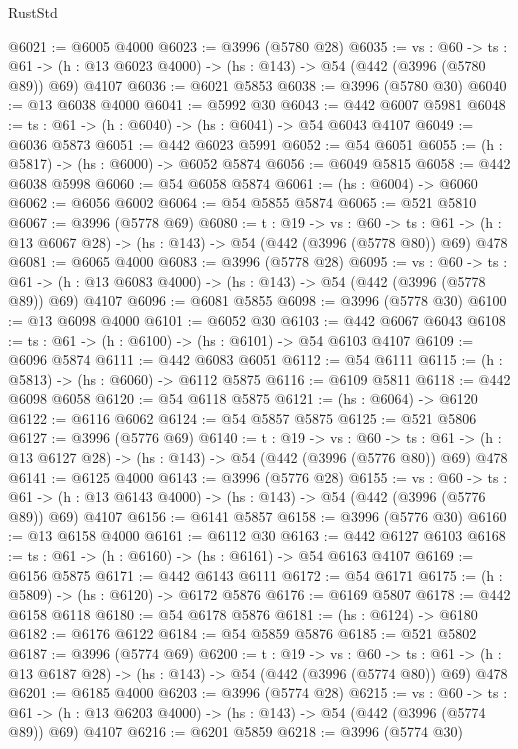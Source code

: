 \begin{lexlean}{RustStd}
\begin{coremodule}
@6021 := @6005 @4000
@6023 := @3996 (@5780 @28)
@6035 := {vs : @60} ->
  {ts : @61} -> (h : @13 @6023 @4000) -> (hs : @143) -> @54 (@442 (@3996 (@5780 @89)) @69) @4107
@6036 := @6021 @5853
@6038 := @3996 (@5780 @30)
@6040 := @13 @6038 @4000
@6041 := @5992 @30
@6043 := @442 @6007 @5981
@6048 := {ts : @61} -> (h : @6040) -> (hs : @6041) -> @54 @6043 @4107
@6049 := @6036 @5873
@6051 := @442 @6023 @5991
@6052 := @54 @6051
@6055 := (h : @5817) -> (hs : @6000) -> @6052 @5874
@6056 := @6049 @5815
@6058 := @442 @6038 @5998
@6060 := @54 @6058 @5874
@6061 := (hs : @6004) -> @6060
@6062 := @6056 @6002
@6064 := @54 @5855 @5874
@6065 := @521 @5810
@6067 := @3996 (@5778 @69)
@6080 := {t : @19} ->
  {vs : @60} ->
  {ts : @61} -> (h : @13 @6067 @28) -> (hs : @143) -> @54 (@442 (@3996 (@5778 @80)) @69) @478
@6081 := @6065 @4000
@6083 := @3996 (@5778 @28)
@6095 := {vs : @60} ->
  {ts : @61} -> (h : @13 @6083 @4000) -> (hs : @143) -> @54 (@442 (@3996 (@5778 @89)) @69) @4107
@6096 := @6081 @5855
@6098 := @3996 (@5778 @30)
@6100 := @13 @6098 @4000
@6101 := @6052 @30
@6103 := @442 @6067 @6043
@6108 := {ts : @61} -> (h : @6100) -> (hs : @6101) -> @54 @6103 @4107
@6109 := @6096 @5874
@6111 := @442 @6083 @6051
@6112 := @54 @6111
@6115 := (h : @5813) -> (hs : @6060) -> @6112 @5875
@6116 := @6109 @5811
@6118 := @442 @6098 @6058
@6120 := @54 @6118 @5875
@6121 := (hs : @6064) -> @6120
@6122 := @6116 @6062
@6124 := @54 @5857 @5875
@6125 := @521 @5806
@6127 := @3996 (@5776 @69)
@6140 := {t : @19} ->
  {vs : @60} ->
  {ts : @61} -> (h : @13 @6127 @28) -> (hs : @143) -> @54 (@442 (@3996 (@5776 @80)) @69) @478
@6141 := @6125 @4000
@6143 := @3996 (@5776 @28)
@6155 := {vs : @60} ->
  {ts : @61} -> (h : @13 @6143 @4000) -> (hs : @143) -> @54 (@442 (@3996 (@5776 @89)) @69) @4107
@6156 := @6141 @5857
@6158 := @3996 (@5776 @30)
@6160 := @13 @6158 @4000
@6161 := @6112 @30
@6163 := @442 @6127 @6103
@6168 := {ts : @61} -> (h : @6160) -> (hs : @6161) -> @54 @6163 @4107
@6169 := @6156 @5875
@6171 := @442 @6143 @6111
@6172 := @54 @6171
@6175 := (h : @5809) -> (hs : @6120) -> @6172 @5876
@6176 := @6169 @5807
@6178 := @442 @6158 @6118
@6180 := @54 @6178 @5876
@6181 := (hs : @6124) -> @6180
@6182 := @6176 @6122
@6184 := @54 @5859 @5876
@6185 := @521 @5802
@6187 := @3996 (@5774 @69)
@6200 := {t : @19} ->
  {vs : @60} ->
  {ts : @61} -> (h : @13 @6187 @28) -> (hs : @143) -> @54 (@442 (@3996 (@5774 @80)) @69) @478
@6201 := @6185 @4000
@6203 := @3996 (@5774 @28)
@6215 := {vs : @60} ->
  {ts : @61} -> (h : @13 @6203 @4000) -> (hs : @143) -> @54 (@442 (@3996 (@5774 @89)) @69) @4107
@6216 := @6201 @5859
@6218 := @3996 (@5774 @30)

\end{coremodule}
\end{lexlean}
